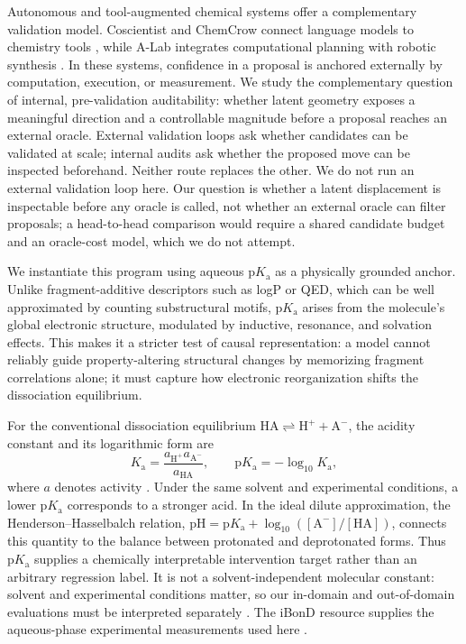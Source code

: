 \documentclass[11pt]{article}
\newcommand{\pka}{\mathrm{p}K_{\mathrm a}}
\begin{document}
Autonomous and tool-augmented chemical systems offer a complementary validation model. Coscientist and ChemCrow connect language models to chemistry tools \citep{Boiko2023Coscientist,Bran2024ChemCrow}, while A-Lab integrates computational planning with robotic synthesis \citep{Szymanski2023ALab}. In these systems, confidence in a proposal is anchored externally by computation, execution, or measurement. We study the complementary question of internal, pre-validation auditability: whether latent geometry exposes a meaningful direction and a controllable magnitude before a proposal reaches an external oracle. External validation loops ask whether candidates can be validated at scale; internal audits ask whether the proposed move can be inspected beforehand. Neither route replaces the other. We do not run an external validation loop here. Our question is whether a latent displacement is inspectable before any oracle is called, not whether an external oracle can filter proposals; a head-to-head comparison would require a shared candidate budget and an oracle-cost model, which we do not attempt.

We instantiate this program using aqueous $\pka$ as a physically grounded anchor. Unlike fragment-additive descriptors such as logP or QED, which can be well approximated by counting substructural motifs, $\pka$ arises from the molecule's global electronic structure, modulated by inductive, resonance, and solvation effects. This makes it a stricter test of causal representation: a model cannot reliably guide property-altering structural changes by memorizing fragment correlations alone; it must capture how electronic reorganization shifts the dissociation equilibrium.

For the conventional dissociation equilibrium $\mathrm{HA}\rightleftharpoons\mathrm{H}^{+}+\mathrm{A}^{-}$, the acidity constant and its logarithmic form are
\begin{equation}
 K_{\mathrm a}=\frac{a_{\mathrm H^+}a_{\mathrm A^-}}{a_{\mathrm{HA}}},
 \qquad \pka=-\log_{10}K_{\mathrm a},
\end{equation}
where $a$ denotes activity \citep{IUPACAcidityConstant}. Under the same solvent and experimental conditions, a lower $\pka$ corresponds to a stronger acid. In the ideal dilute approximation, the Henderson--Hasselbalch relation, $\mathrm{pH}=\pka+\log_{10}([\mathrm A^-]/[\mathrm{HA}])$, connects this quantity to the balance between protonated and deprotonated forms. Thus $\pka$ supplies a chemically interpretable intervention target rather than an arbitrary regression label. It is not a solvent-independent molecular constant: solvent and experimental conditions matter, so our in-domain and out-of-domain evaluations must be interpreted separately \citep{Yang2020HolisticPKa}. The iBonD resource supplies the aqueous-phase experimental measurements used here \citep{YangIbonD,Wang2026iBonD}.
\end{document}
